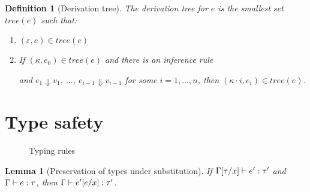 \documentclass[12pt,a2paper,draft]{article}
\newcommand{\abstr}[2]{\ensuremath{\lambda{#1}.\,{#2}}}
\newcommand{\app}[2]{\ensuremath{{#1}\,{#2}}}
\newcommand{\rec}[2]{\ensuremath{{\normalfont\textsf{rec}}\,{#1}.\,{#2}}}
\newcommand{\unit}{\ensuremath{\normalfont\textsf{unit}}}
\newcommand{\Unit}{\ensuremath{\normalfont\textsf{Unit}}}
\newcommand{\tj}[2]{\mbox{\ensuremath{{#1}:{#2}}}}
\newcommand{\Tj}[3]{\mbox{\ensuremath{{#1}\vdash\tj{#2}{#3}}}}
\newcommand{\tree}[1]{\mathit{tree}(#1)}
\newtheorem{lemma}{Lemma}
\newtheorem{definition}{Definition}
\begin{document}
\begin{definition}[Derivation tree] \label{definition:Derivation_tree}
  The \emph{derivation tree} for $e$ is the smallest set $\tree{e}$ such that:
  \begin{enumerate}
  \item $(\varepsilon, e) \in \tree{e}$
  \item If $(\kappa,e_0) \in \tree{e}$ and there is an inference rule
    \begin{mathpar}
    \end{mathpar}
    and $e_1 \Downarrow v_1$, $\ldots$, $e_{i-1} \Downarrow v_{i-1}$ for some $i = 1,\ldots,n$, then
    $(\kappa \cdot i,e_i) \in \tree{e}$.
  \end{enumerate}
\end{definition}


\section{Type safety}

\begin{figure}[htb]
  \centering
  \caption{Typing rules}
  \label{figure:Typing_rules}
\end{figure}

\begin{lemma}[Preservation of types under substitution] \label{lemma:Preservation_of_types_under_substitution}
  If $\Tj{\Gamma[\tau/x]}{e'}{\tau'}$ and $\Tj{\Gamma}{e}{\tau}$,
  then $\Tj{\Gamma}{e'[e/x]}{\tau'}$.
\end{lemma}
\end{document}
